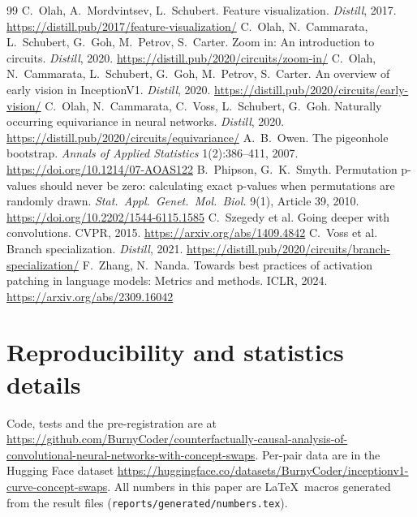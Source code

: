 \documentclass[11pt]{article}
\begin{document}
\begin{thebibliography}{99}
 C.~Olah, A.~Mordvintsev, L.~Schubert. Feature visualization. \emph{Distill}, 2017. \url{https://distill.pub/2017/feature-visualization/}
 C.~Olah, N.~Cammarata, L.~Schubert, G.~Goh, M.~Petrov, S.~Carter. Zoom in: An introduction to circuits. \emph{Distill}, 2020. \url{https://distill.pub/2020/circuits/zoom-in/}
 C.~Olah, N.~Cammarata, L.~Schubert, G.~Goh, M.~Petrov, S.~Carter. An overview of early vision in InceptionV1. \emph{Distill}, 2020. \url{https://distill.pub/2020/circuits/early-vision/}
 C.~Olah, N.~Cammarata, C.~Voss, L.~Schubert, G.~Goh. Naturally occurring equivariance in neural networks. \emph{Distill}, 2020. \url{https://distill.pub/2020/circuits/equivariance/}
 A.~B.~Owen. The pigeonhole bootstrap. \emph{Annals of Applied Statistics} 1(2):386--411, 2007. \url{https://doi.org/10.1214/07-AOAS122}
 B.~Phipson, G.~K.~Smyth. Permutation p-values should never be zero: calculating exact p-values when permutations are randomly drawn. \emph{Stat.\ Appl.\ Genet.\ Mol.\ Biol.} 9(1), Article 39, 2010. \url{https://doi.org/10.2202/1544-6115.1585}
 C.~Szegedy et al. Going deeper with convolutions. CVPR, 2015. \url{https://arxiv.org/abs/1409.4842}
 C.~Voss et al. Branch specialization. \emph{Distill}, 2021. \url{https://distill.pub/2020/circuits/branch-specialization/}
 F.~Zhang, N.~Nanda. Towards best practices of activation patching in language models: Metrics and methods. ICLR, 2024. \url{https://arxiv.org/abs/2309.16042}
\end{thebibliography}

\appendix
\section{Reproducibility and statistics details}
Code, tests and the pre-registration are at \url{https://github.com/BurnyCoder/counterfactually-causal-analysis-of-convolutional-neural-networks-with-concept-swaps}. Per-pair data are in the Hugging Face dataset \url{https://huggingface.co/datasets/BurnyCoder/inceptionv1-curve-concept-swaps}. All numbers in this paper are \LaTeX\ macros generated from the result files (\texttt{reports/generated/numbers.tex}).
\end{document}
